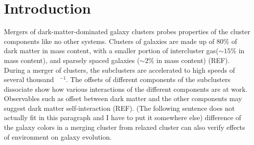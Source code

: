 \section{Introduction} 
Mergers of dark-matter-dominated galaxy clusters probes properties
of the cluster components like no other systems. 
Clusters of galaxies are made up of 80\% of dark matter in mass content, 
with a smaller  portion of intercluster gas($\sim 15\%$ in mass content), and
sparsely spaced galaxies ($\sim 2\%$ in mass content) (REF). During a merger of
clusters, the subclusters are accelerated to high speeds of several
thousand \kilo \meter~\second$^{-1}$. The offsets of different components
of the subclusters dissociate show how various interactions of the different
components are at work. Observables such as offset between dark
matter and the other components may suggest dark matter self-interaction
(REF).  (The following sentence does not actually fit in this paragraph and
I have to put it somewhere else) difference of the galaxy colors in a merging cluster from relaxed cluster can also verify effects of environment on galaxy evolution.\par

